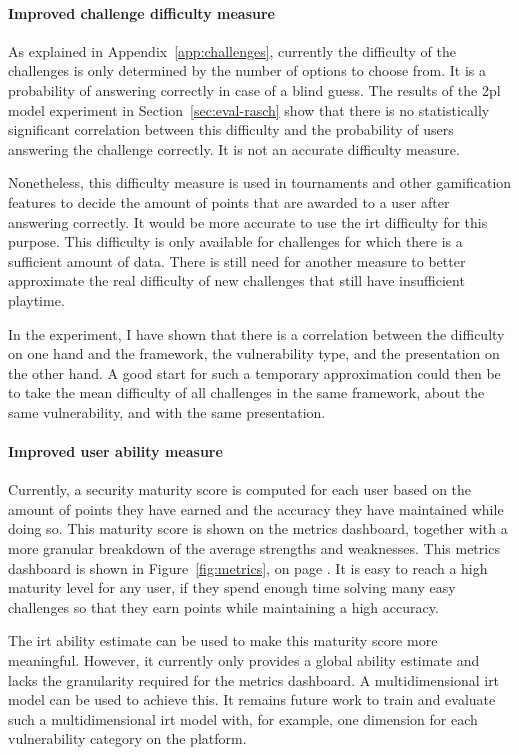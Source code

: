 \paragraph{Improved challenge difficulty measure}
As explained in Appendix~\ref{app:challenges}, currently the difficulty of the challenges is only determined by the number of options to choose from.
It is a probability of answering correctly in case of a blind guess.
The results of the \gls{2pl} model experiment in Section~\ref{sec:eval-rasch} show that there is no statistically significant correlation between this difficulty and the probability of users answering the challenge correctly.
It is not an accurate difficulty measure.

Nonetheless, this difficulty measure is used in tournaments and other gamification features to decide the amount of points that are awarded to a user after answering correctly.
It would be more accurate to use the \gls{irt} difficulty for this purpose.
This difficulty is only available for challenges for which there is a sufficient amount of data.
There is still need for another measure to better approximate the real difficulty of new challenges that still have insufficient playtime.

In the experiment, I have shown that there is a correlation between the difficulty on one hand and the framework, the vulnerability type, and the presentation on the other hand.
A good start for such a temporary approximation could then be to take the mean difficulty of all challenges in the same framework, about the same vulnerability, and with the same presentation.

\paragraph{Improved user ability measure}
Currently, a security maturity score is computed for each user based on the amount of points they have earned and the accuracy they have maintained while doing so.
This maturity score is shown on the metrics dashboard, together with a more granular breakdown of the average strengths and weaknesses.
This metrics dashboard is shown in Figure~\ref{fig:metrics}, on page \pageref{fig:metrics}.
It is easy to reach a high maturity level for any user, if they spend enough time solving many easy challenges so that they earn points while maintaining a high accuracy.

The \gls{irt} ability estimate can be used to make this maturity score more meaningful.
However, it currently only provides a global ability estimate and lacks the granularity required for the metrics dashboard.
A multidimensional \gls{irt} model can be used to achieve this.
It remains future work to train and evaluate such a multidimensional \gls{irt} model with, for example, one dimension for each vulnerability category on the platform.

